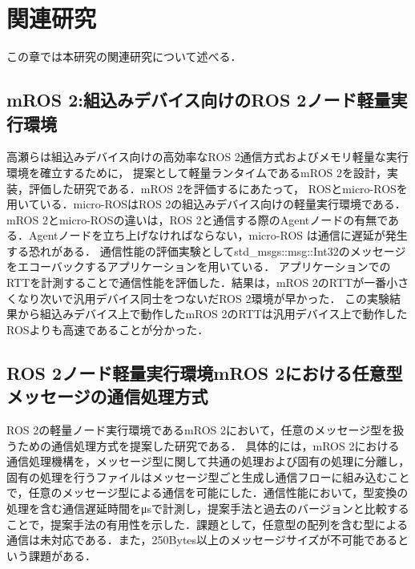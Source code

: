 \chapter{関連研究}
この章では本研究の関連研究について述べる．
\section{mROS 2:組込みデバイス向けのROS 2ノード軽量実行環境}
高瀬らは組込みデバイス向けの高効率なROS 2通信方式およびメモリ軽量な実行環境を確立するために，
提案として軽量ランタイムであるmROS 2を設計，実装，評価した研究である．mROS 2を評価するにあたって，
ROSとmicro-ROSを用いている．micro-ROSはROS 2の組込みデバイス向けの軽量実行環境である．
mROS 2とmicro-ROSの違いは，ROS 2と通信する際のAgentノードの有無である．Agentノードを立ち上げなければならない，micro-ROS は通信に遅延が発生する恐れがある．
通信性能の評価実験としてstd\_msgs::msg::Int32のメッセージをエコーバックするアプリケーションを用いている．
アプリケーションでのRTTを計測することで通信性能を評価した．結果は，mROS 2のRTTが一番小さくなり次いで汎用デバイス同士をつないだROS 2環境が早かった．
この実験結果から組込みデバイス上で動作したmROS 2のRTTは汎用デバイス上で動作したROSよりも高速であることが分かった．
\section{ROS 2ノード軽量実行環境mROS 2における任意型メッセージの通信処理方式}
ROS 2の軽量ノード実行環境であるmROS 2において，任意のメッセージ型を扱うための通信処理方式を提案した研究である．
具体的には，mROS 2における通信処理機構を，メッセージ型に関して共通の処理および固有の処理に分離し，固有の処理を行うファイルはメッセージ型ごと生成し通信フローに組み込むことで，任意のメッセージ型による通信を可能にした．通信性能において，型変換の処理を含む通信遅延時間をμsで計測し，提案手法と過去のバージョンと比較することで，提案手法の有用性を示した．課題として，任意型の配列を含む型による通信は未対応である．また，250Bytes以上のメッセージサイズが不可能であるという課題がある．